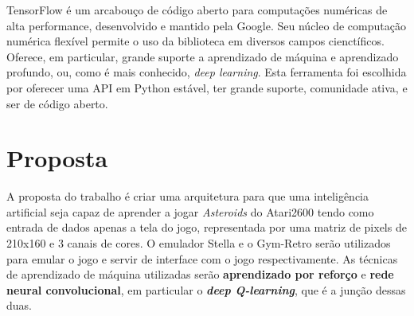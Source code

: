 TensorFlow é um arcabouço de código aberto para computações numéricas de alta performance, desenvolvido e mantido pela Google.
Seu núcleo de computação numérica flexível permite o uso da biblioteca em diversos campos cienctíficos.
Oferece, em particular, grande suporte a aprendizado de máquina e aprendizado profundo, ou, como é mais conhecido, \textit{deep learning}.
Esta ferramenta foi escolhida por oferecer uma API em Python estável, ter grande suporte, comunidade ativa, e ser de código aberto.


\section{Proposta}
\label{sec:proposta}

A proposta do trabalho é criar uma arquitetura para que uma inteligência artificial seja capaz de aprender a jogar \textit{Asteroids} do Atari2600 tendo como entrada de dados apenas a tela do jogo, representada por uma matriz de pixels de 210x160 e 3 canais de cores.
O emulador Stella e o Gym-Retro serão utilizados para emular o jogo e servir de interface com o jogo respectivamente.
As técnicas de aprendizado de máquina utilizadas serão \textbf{aprendizado por reforço} e \textbf{rede neural convolucional}, em particular o \textbf{\textit{deep Q-learning}}, que é a junção dessas duas.
